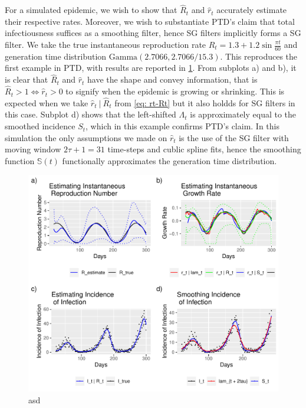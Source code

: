 \documentclass[12pt]{article}
\begin{document}
      For a simulated epidemic, we wish to show that $\hat{R}_t$ and $\hat{r}_t$ accurately estimate their respective rates. Moreover, we wish to substantiate PTD's claim
      that total infectiousness suffices as a smoothing filter, hence SG filters implicitly forms a SG filter.
      We take the true instantaneous reproduction rate $R_t = 1.3 + 1.2\sin{\frac{\pi t}{60}}$ and generation time distribution $\text{Gamma}(2.7066, 2.7066 / 15.3)$. 
      This reproduces the first example in PTD, with results are reported in \cref{fig: paper}. From subplots a) and b), it is clear that $\hat{R}_t$ and $\hat{r}_t$ have the shape and convey information, 
      that is $\hat{R}_t > 1 \iff \hat{r}_t > 0$ to signify when the epidemic is growing or shrinking. This is expected when we take $\hat{r}_t \ |\ \hat{R}_t$ from \cref{eq: rt-Rt}
      but it also holdds for SG filters in this case. Subplot d) shows that the left-shifted $\Lambda_t$ is approximately equal to the smoothed incidence $S_t$, 
      which in this example confirms PTD's claim. In this simulation the only assumptions we made on $\hat{r}_t$ is the use of the SG filter with moving window 
      $2\tau + 1 = 31$ time-steps and cublic spline fits, hence the smoothing function $\mathbb{S}(t)$ functionally approximates the generation time distribution.

      \begin{figure}[h]
        \includegraphics[width = \linewidth]{epi_paper.pdf}
        \caption{asd}
        \label{fig: paper}
      \end{figure}
\end{document}
